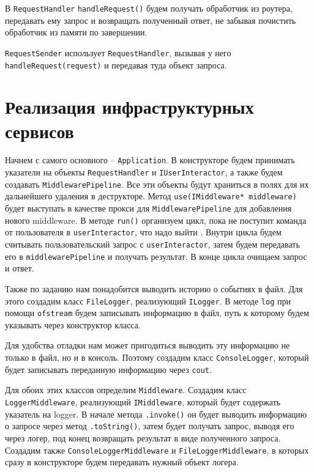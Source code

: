 В \verb|RequestHandler| \verb|handleRequest()| будем получать обработчик из роутера, передавать ему запрос и возвращать полученный ответ, не забывая почистить обработчик из памяти по завершении.

\verb|RequestSender| использует \verb|RequestHandler|, вызывая у него \verb|handleRequest(request)| и передавая туда объект запроса.

\section{Реализация инфраструктурных сервисов} \label{ch2:sec3}

Начнем с самого основного – \verb|Application|. В конструкторе будем принимать указатели на объекты \verb|RequestHandler| и \verb|IUserInteractor|, а также будем создавать \verb|MiddlewarePipeline|. Все эти объекты будут храниться в полях для их дальнейшего удаления в деструкторе. Метод \verb|use(IMiddleware* middleware)| будет выступать в качестве прокси для \verb|MiddlewarePipeline| для добавления нового middleware. В методе \verb|run()| организуем цикл, пока не поступит команда от пользователя в \verb|userInteractor|, что надо выйти . Внутри цикла будем считывать пользовательский запрос с \verb|userInteractor|, затем будем передавать его в \verb|middlewarePipeline| и получать результат. В конце цикла очищаем запрос и ответ.

Также по заданию нам понадобится выводить историю о событиях в файл. Для этого создадим класс \verb|FileLogger|, реализующий \verb|ILogger|. В методе \verb|log| при помощи \verb|ofstream| будем записывать информацию в файл, путь к которому будем указывать через конструктор класса. 

Для удобства отладки нам может пригодиться выводить эту информацию не только в файл, но и в консоль. Поэтому создадим класс \verb|ConsoleLogger|, который будет записывать переданную информацию через \verb|сout|.

Для обоих этих классов определим \verb|Middleware|. Создадим класс \verb|LoggerMiddleware|, реализующий \verb|IMiddleware|, который будет содержать указатель на logger. В начале метода \verb|.invoke()| он будет выводить информацию о запросе через метод \verb|.toString()|, затем будет получать запрос, выводя его через логер, под конец возвращать результат в виде полученного запроса. Создадим также \verb|ConsoleLoggerMiddleware| и \verb|FileLoggerMiddleware|, в которых сразу в конструкторе будем передавать нужный объект логера.

